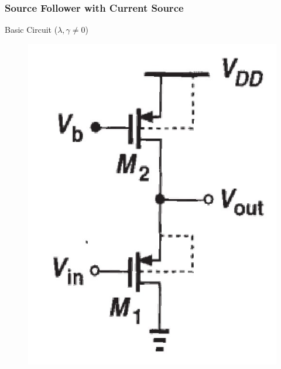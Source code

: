 \documentclass{beamer}
\begin{document}
\begin{frame}
    \frametitle{Source Follower with Current Source}
    \begin{minipage}{0.45\linewidth}
        Basic Circuit ($\lambda, \gamma\not= 0$)
        \begin{figure}[H]
            \centering
            \includegraphics[width=0.8\linewidth]{source-follower-D.png}
        \end{figure}
         

\end{minipage}
\end{frame}
\end{document}
